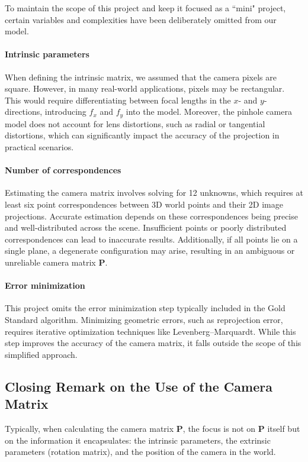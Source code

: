 \documentclass[12pt]{article}
\begin{document}
To maintain the scope of this project and keep it focused as a ``mini" project, certain variables and complexities have been deliberately omitted from our model.

\paragraph{Intrinsic parameters} When defining the intrinsic matrix, we assumed that the camera pixels are square. However, in many real-world applications, pixels may be rectangular. This would require differentiating between focal lengths in the \( x \)- and \( y \)-directions, introducing \( f_x \) and \( f_y \) into the model. Moreover, the pinhole camera model does not account for lens distortions, such as radial or tangential distortions, which can significantly impact the accuracy of the projection in practical scenarios.

\paragraph{Number of correspondences} Estimating the camera matrix involves solving for 12 unknowns, which requires at least six point correspondences between 3D world points and their 2D image projections. Accurate estimation depends on these correspondences being precise and well-distributed across the scene. Insufficient points or poorly distributed correspondences can lead to inaccurate results. Additionally, if all points lie on a single plane, a degenerate configuration may arise, resulting in an ambiguous or unreliable camera matrix \( \mathbf{P} \).

\paragraph{Error minimization} This project omits the error minimization step typically included in the Gold Standard algorithm. Minimizing geometric errors, such as reprojection error, requires iterative optimization techniques like Levenberg--Marquardt. While this step improves the accuracy of the camera matrix, it falls outside the scope of this simplified approach.

\subsection{Closing Remark on the Use of the Camera Matrix}

Typically, when calculating the camera matrix \( \mathbf{P} \), the focus is not on \( \mathbf{P} \) itself but on the information it encapsulates: the intrinsic parameters, the extrinsic parameters (rotation matrix), and the position of the camera in the world.
\end{document}
